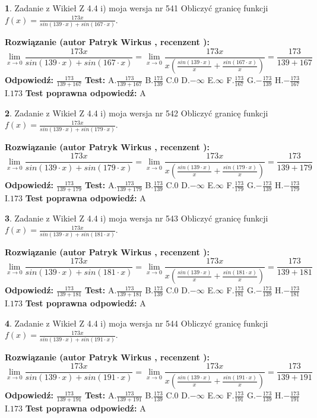 \documentclass[12pt, a4paper]{article}
\theoremstyle{definition} %
\newtheorem{zad}{}
\newcommand{\zadStart}[1]{\begin{zad}#1\newline}
\newcommand{\zadStop}{\end{zad}}
\newcommand{\rozwStart}[2]{\noindent \textbf{Rozwiązanie (autor #1 , recenzent #2): }\newline}
\newcommand{\rozwStop}{\newline}
\newcommand{\odpStart}{\noindent \textbf{Odpowiedź:}\newline}
\newcommand{\odpStop}{\newline}
\newcommand{\testStart}{\noindent \textbf{Test:}\newline}
\newcommand{\testStop}{\newline}
\newcommand{\kluczStart}{\noindent \textbf{Test poprawna odpowiedź:}\newline}
\newcommand{\kluczStop}{\newline}
\begin{document}
\zadStart{Zadanie z Wikieł Z 4.4 i) moja wersja nr 541}
Obliczyć granicę funkcji $f(x)=\frac{173x}{sin(139\cdot x) +sin(167\cdot x)}$.
\zadStop
\rozwStart{Patryk Wirkus}{}
$$\lim\limits_{x\to 0}\frac{173x}{sin(139\cdot x) +sin(167\cdot x)}=\lim\limits_{x\to 0}\frac{173x}{x(\frac{sin(139\cdot x)}{x}+\frac{sin(167\cdot x)}{x})}=\frac{173}{139+167}$$
\rozwStop
\odpStart
$\frac{173}{139+167}$
\odpStop
\testStart
A.$\frac{173}{139+167}$
B.$\frac{173}{139}$
C.$0$
D.$-\infty$
E.$\infty$
F.$\frac{173}{167}$
G.$-\frac{173}{139}$
H.$-\frac{173}{167}$
I.$173$
\testStop
\kluczStart
A
\kluczStop



\zadStart{Zadanie z Wikieł Z 4.4 i) moja wersja nr 542}
Obliczyć granicę funkcji $f(x)=\frac{173x}{sin(139\cdot x) +sin(179\cdot x)}$.
\zadStop
\rozwStart{Patryk Wirkus}{}
$$\lim\limits_{x\to 0}\frac{173x}{sin(139\cdot x) +sin(179\cdot x)}=\lim\limits_{x\to 0}\frac{173x}{x(\frac{sin(139\cdot x)}{x}+\frac{sin(179\cdot x)}{x})}=\frac{173}{139+179}$$
\rozwStop
\odpStart
$\frac{173}{139+179}$
\odpStop
\testStart
A.$\frac{173}{139+179}$
B.$\frac{173}{139}$
C.$0$
D.$-\infty$
E.$\infty$
F.$\frac{173}{179}$
G.$-\frac{173}{139}$
H.$-\frac{173}{179}$
I.$173$
\testStop
\kluczStart
A
\kluczStop



\zadStart{Zadanie z Wikieł Z 4.4 i) moja wersja nr 543}
Obliczyć granicę funkcji $f(x)=\frac{173x}{sin(139\cdot x) +sin(181\cdot x)}$.
\zadStop
\rozwStart{Patryk Wirkus}{}
$$\lim\limits_{x\to 0}\frac{173x}{sin(139\cdot x) +sin(181\cdot x)}=\lim\limits_{x\to 0}\frac{173x}{x(\frac{sin(139\cdot x)}{x}+\frac{sin(181\cdot x)}{x})}=\frac{173}{139+181}$$
\rozwStop
\odpStart
$\frac{173}{139+181}$
\odpStop
\testStart
A.$\frac{173}{139+181}$
B.$\frac{173}{139}$
C.$0$
D.$-\infty$
E.$\infty$
F.$\frac{173}{181}$
G.$-\frac{173}{139}$
H.$-\frac{173}{181}$
I.$173$
\testStop
\kluczStart
A
\kluczStop



\zadStart{Zadanie z Wikieł Z 4.4 i) moja wersja nr 544}
Obliczyć granicę funkcji $f(x)=\frac{173x}{sin(139\cdot x) +sin(191\cdot x)}$.
\zadStop
\rozwStart{Patryk Wirkus}{}
$$\lim\limits_{x\to 0}\frac{173x}{sin(139\cdot x) +sin(191\cdot x)}=\lim\limits_{x\to 0}\frac{173x}{x(\frac{sin(139\cdot x)}{x}+\frac{sin(191\cdot x)}{x})}=\frac{173}{139+191}$$
\rozwStop
\odpStart
$\frac{173}{139+191}$
\odpStop
\testStart
A.$\frac{173}{139+191}$
B.$\frac{173}{139}$
C.$0$
D.$-\infty$
E.$\infty$
F.$\frac{173}{191}$
G.$-\frac{173}{139}$
H.$-\frac{173}{191}$
I.$173$
\testStop
\kluczStart
A
\kluczStop
\end{document}
